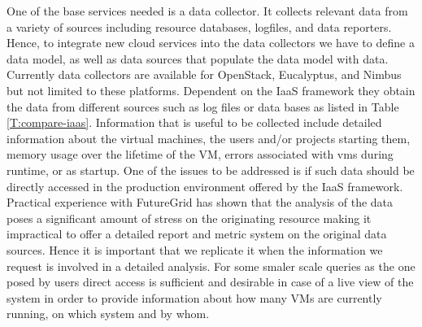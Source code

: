 \documentclass{tex/sig-alternate-2013}
\begin{document}
{One of the base services needed is a data collector. It collects relevant data from a variety of sources including resource databases, logfiles, and data reporters. Hence, to integrate new cloud services into the data collectors we have to define a data model, as well as data sources that populate the data model with data. Currently data collectors are available for OpenStack, Eucalyptus, and Nimbus but not limited to these platforms. Dependent on the IaaS framework they obtain the data from different sources such as log files or data bases as listed in Table \ref{T:compare-iaas}. Information that is useful to be collected include detailed information about the virtual machines, the users and/or projects starting them, memory usage over the lifetime of the VM, errors associated with vms during runtime, or as startup. One of the issues to be addressed is if such data should be directly accessed in the production environment offered by the IaaS framework. Practical experience with FutureGrid has shown that the analysis of the data poses a significant amount of stress on the originating resource making it impractical to offer a detailed report and metric system on the original data sources. Hence it is important that we replicate it when the information we request is involved in a detailed analysis. For some smaler scale queries as the one posed by users direct access is sufficient and desirable in case of a live view of the system in order to provide information about how many VMs are currently running, on which system and by whom.



\newcommand{\YES}{\ding{51}}
\newcommand{\NO}{\ding{55}}


}
\end{document}
